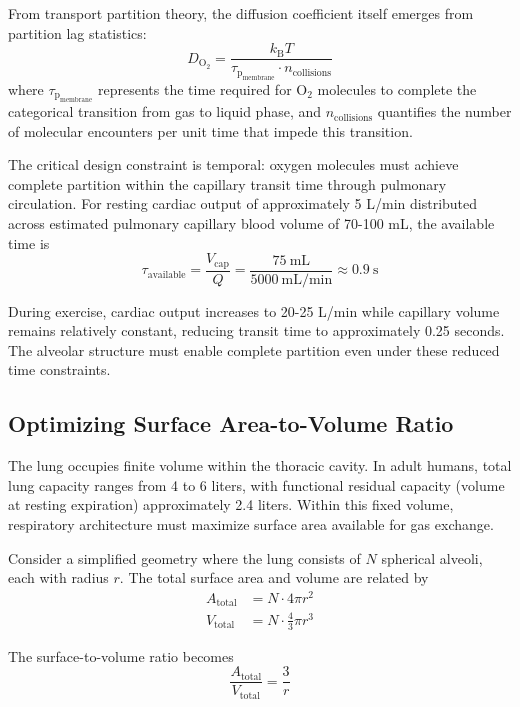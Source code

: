 \documentclass[10pt,twocolumn,a4paper]{article}
\theoremstyle{remark}
\newcommand{\kB}{k_{\mathrm{B}}}
\newcommand{\taulag}{\tau_{\mathrm{p}}}
\begin{document}
From transport partition theory, the diffusion coefficient itself emerges from partition lag statistics:
\begin{equation}
D_{\mathrm{O}_{2}} = \frac{\kB T}{\taulag_{\mathrm{membrane}} \cdot n_{\mathrm{collisions}}}
\end{equation}
where $\taulag_{\mathrm{membrane}}$ represents the time required for O$_{2}$ molecules to complete the categorical transition from gas to liquid phase, and $n_{\mathrm{collisions}}$ quantifies the number of molecular encounters per unit time that impede this transition.

The critical design constraint is temporal: oxygen molecules must achieve complete partition within the capillary transit time through pulmonary circulation. For resting cardiac output of approximately 5 L/min distributed across estimated pulmonary capillary blood volume of 70-100 mL, the available time is
\begin{equation}
\tau_{\mathrm{available}} = \frac{V_{\mathrm{cap}}}{Q} = \frac{75~\mathrm{mL}}{5000~\mathrm{mL/min}} \approx 0.9~\mathrm{s}
\end{equation}

During exercise, cardiac output increases to 20-25 L/min while capillary volume remains relatively constant, reducing transit time to approximately 0.25 seconds. The alveolar structure must enable complete partition even under these reduced time constraints.

\subsection{Optimizing Surface Area-to-Volume Ratio}

The lung occupies finite volume within the thoracic cavity. In adult humans, total lung capacity ranges from 4 to 6 liters, with functional residual capacity (volume at resting expiration) approximately 2.4 liters. Within this fixed volume, respiratory architecture must maximize surface area available for gas exchange.

Consider a simplified geometry where the lung consists of $N$ spherical alveoli, each with radius $r$. The total surface area and volume are related by
\begin{align}
A_{\mathrm{total}} &= N \cdot 4\pi r^{2} \\
V_{\mathrm{total}} &= N \cdot \frac{4}{3}\pi r^{3}
\end{align}

The surface-to-volume ratio becomes
\begin{equation}
\frac{A_{\mathrm{total}}}{V_{\mathrm{total}}} = \frac{3}{r}
\end{equation}
\end{document}
